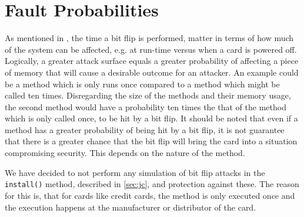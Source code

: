 \section{Fault Probabilities}
As mentioned in , the time a bit flip is performed, matter in terms of how much of the system can be affected, e.g. at run-time versus when a card is powered off. Logically, a greater attack surface equals a greater probability of affecting a piece of memory that will cause a desirable outcome for an attacker. An example could be a method which is only runs once compared to a method which might be called ten times. Disregarding the size of the methods and their memory usage, the second method would have a probability ten times the that of the method which is only called once, to be hit by a bit flip. It should be noted that even if a method has a greater probability of being hit by a bit flip, it is not guarantee that there is a greater chance that the bit flip will bring the card into a situation compromising security. This depends on the nature of the method.


We have decided to not perform any simulation of bit flip attacks in the \texttt{install()} method, described in \cref{sec:jc}, and protection against these. The reason for this is, that for cards like credit cards, the method is only executed once and the execution happens at the manufacturer or distributor of the card.

%